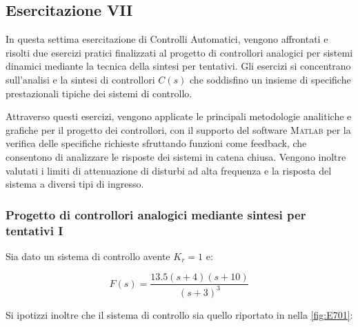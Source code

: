 \documentclass[../main.tex]{subfiles}
\begin{document}
\clearpage
\thispagestyle{empty}
\subsection{Esercitazione VII}

In questa settima esercitazione di Controlli Automatici, vengono affrontati e risolti due esercizi pratici finalizzati al progetto di controllori analogici per sistemi dinamici mediante la tecnica della sintesi per tentativi. Gli esercizi si concentrano sull’analisi e la sintesi di controllori $C(s)$ che soddisfino un insieme di specifiche prestazionali tipiche dei sistemi di controllo.

Attraverso questi esercizi, vengono applicate le principali metodologie analitiche e grafiche per il progetto dei controllori, con il supporto del software \textsc{Matlab} per la verifica delle specifiche richieste sfruttando funzioni come feedback, che consentono di analizzare le risposte dei sistemi in catena chiusa. Vengono inoltre valutati i limiti di attenuazione di disturbi ad alta frequenza e la risposta del sistema a diversi tipi di ingresso.


\vspace*{1cm}
\subsubsection{Progetto di controllori analogici mediante sintesi per tentativi I}
\label{tentativi1}

Sia dato un sistema di controllo avente $K_r = 1$ e:

\begin{equation}
	F(s) = \frac{13.5(s+4)(s+10)}{(s+3)^3}
\end{equation}

Si ipotizzi inoltre che il sistema di controllo sia quello riportato in nella \autoref{fig:E701}:
\end{document}
